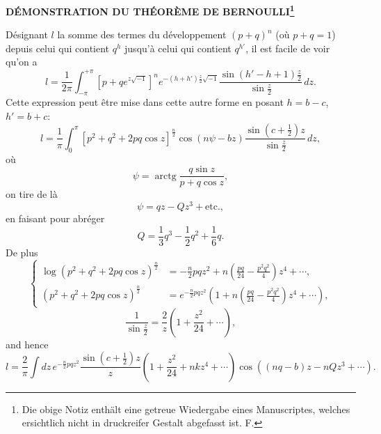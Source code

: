 \documentclass[11pt]{article}
\newcommand{\arctg}{\operatorname{arctg}}
\begin{document}
\begin{center}
{\Large\bfseries DÉMONSTRATION DU THÉORÈME DE BERNOULLI\footnote{Die obige Notiz enthält eine getreue Wiedergabe eines Manuscriptes, welches ersichtlich nicht in druckreifer Gestalt abgefasst ist. F.}\par}
\vspace{0.8em}
\end{center}

Désignant $l$ la somme des termes du développement $(p+q)^n$ (où $p+q=1$) depuis celui qui contient $q^h$ jusqu'à celui qui contient $q^{h'}$, il est facile de voir qu'on a
\begin{equation}
 l=\frac{1}{2\pi}\int_{-\pi}^{+\pi}[p+q e^{z\sqrt{-1}}]^n e^{-(h+h')\frac z2\sqrt{-1}}\frac{\sin (h'-h+1)\frac z2}{\sin\frac z2}\,dz .
\tag{1}
\end{equation}
Cette expression peut être mise dans cette autre forme en posant $h=b-c$, $h'=b+c$:
\begin{equation}
 l=\frac1\pi\int_0^\pi [p^2+q^2+2pq\cos z]^{\frac n2}\cos(n\psi-bz)\frac{\sin(c+\frac12)z}{\sin\frac z2}\,dz,
\tag{2}
\end{equation}
où
\[
 \psi=\arctg\frac{q\sin z}{p+q\cos z},
\]
on tire de là
\begin{equation}
 \psi=qz-Qz^3+\mathrm{etc.},
\tag{3}
\end{equation}
en faisant pour abréger
\[
 Q=\frac13q^3-\frac12q^2+\frac16q.
\]
De plus
\begin{equation}
\left\{\begin{aligned}
\log(p^2+q^2+2pq\cos z)^{\frac n2}
 &= -\frac n2pqz^2+n\left(\frac{pq}{24}-\frac{p^2q^2}{4}\right)z^4+\cdots,\\
(p^2+q^2+2pq\cos z)^{\frac n2}
 &= e^{-\frac n2pqz^2}\left(1+n\left(\frac{pq}{24}-\frac{p^2q^2}{4}\right)z^4+\cdots\right),
\end{aligned}\right.
\tag{4}
\end{equation}
\begin{equation}
 \frac1{\sin\frac z2}=\frac2z\left(1+\frac{z^2}{24}+\cdots\right),
\tag{5}
\end{equation}
and hence
\begin{equation}
 l=\frac2\pi\int dz\,e^{-\frac n2pqz^2}\frac{\sin(c+\frac12)z}{z}\left(1+\frac{z^2}{24}+nkz^4+\cdots\right)\cos((nq-b)z-nQz^3+\cdots).
\tag{6}
\end{equation}
\end{document}
